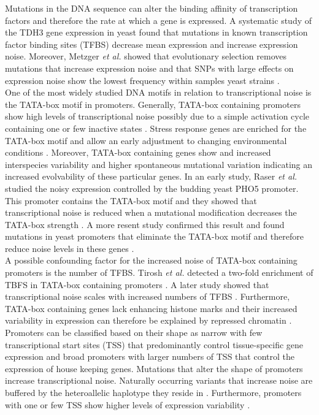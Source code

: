 Mutations in the DNA sequence can alter the binding affinity of transcription factors and therefore the rate at which a gene is expressed. A systematic study of the TDH3 gene expression in yeast found that mutations in known transcription factor binding sites (TFBS) decrease mean expression and increase expression noise. Moreover, Metzger \textit{et al.} showed that evolutionary selection removes mutations that increase expression noise and that SNPs with large effects on expression noise show the lowest frequency within samples yeast strains \citep{Metzger2015}. \\
One of the most widely studied DNA motifs in relation to transcriptional noise is the TATA-box motif in promoters. Generally, TATA-box containing promoters show high levels of transcriptional noise \citep{Faure2017} possibly due to a simple activation cycle containing one or few inactive states \citep{Zoller2015}. Stress response genes are enriched for the TATA-box motif and allow an early adjustment to changing environmental conditions \citep{Lopez-Maury2009}. Moreover, TATA-box containing genes show and increased interspecies variability \citep{Tirosh2006} and higher spontaneous mutational variation \citep{Landry2007} indicating an increased evolvability of these particular genes. In an early study, Raser \textit{et al.} studied the noisy expression controlled by the budding yeast PHO5 promoter. This promoter contains the TATA-box motif and they showed that transcriptional noise is reduced when a mutational modification decreases the TATA-box strength \citep{Raser2004}. A more resent study confirmed this result and found mutations in yeast promoters that eliminate the TATA-box motif and therefore reduce noise levels in these genes \citep{Hornung2012}. \\
A possible confounding factor for the increased noise of TATA-box containing promoters is the number of TFBS. Tirosh \textit{et al.} detected a two-fold enrichment of TBFS in TATA-box containing promoters \citep{Tirosh2006}. A later study showed that transcriptional noise scales with increased numbers of TFBS \citep{Sharon2014}. Furthermore, TATA-box containing genes lack enhancing histone marks and their increased variability in expression can therefore be explained by repressed chromatin \citep{Choi2008}.  \\
Promoters can be classified based on their shape as narrow with few transcriptional start sites (TSS) that predominantly control tissue-specific gene expression and broad promoters with larger numbers of TSS that control the expression of house keeping genes. Mutations that alter the shape of promoters increase transcriptional noise. Naturally occurring variants that increase noise are buffered by the heteroallelic haplotype they reside in \citep{Schor2017a}. Furthermore, promoters with one or few TSS show higher levels of expression variability \citep{Faure2017}.\\
